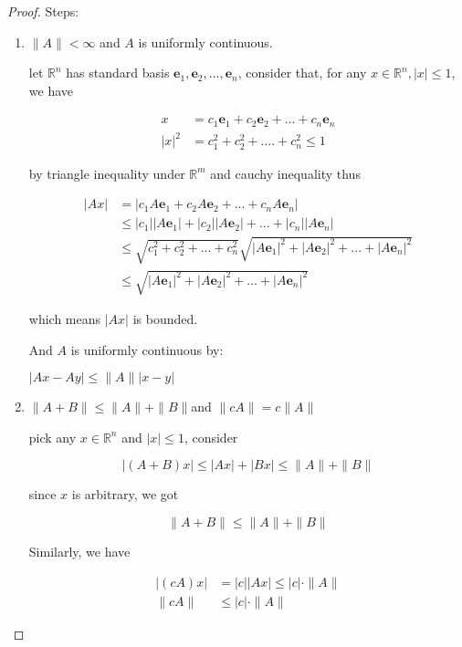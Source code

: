 \begin{proof}
    Steps:

   \begin{enumerate}
    \item $\| A\| < \infty$ and $A$ is uniformly continuous.

    let $\mathbb{R}^n$ has standard basis $\mathbf{e}_1,\mathbf{e}_2,...,\mathbf{e}_n$, consider that,
    for any $x \in \mathbb{R}^n, |x| \le 1$, we have

    \begin{align*}
        x &= c_1\mathbf{e}_1 + c_2\mathbf{e}_2 + ... + c_n\mathbf{e}_n \\
        |x|^2 &= c_1^2 + c_2^2 + .... + c_n^2 \le 1
    \end{align*}

    by triangle inequality under $\mathbb{R}^m$ and cauchy inequality thus

    \begin{align*}
        | Ax| &= \left| c_1 A\mathbf{e}_1 + c_2 A\mathbf{e}_2 + ... + c_n A\mathbf{e}_n\right| \\
        & \le |c_1| \left|  A\mathbf{e}_1 \right| + |c_2| \left|  A\mathbf{e}_2 \right| + ... + |c_n| \left|  A\mathbf{e}_n \right| \\
        & \le \sqrt{c_1^2 + c_2^2 + ... + c_n^2} \sqrt{|A\mathbf{e}_1|^2 + |A\mathbf{e}_2|^2 + ... + |A\mathbf{e}_n|^2} \\
        & \le \sqrt{|A\mathbf{e}_1|^2 + |A\mathbf{e}_2|^2 + ... + |A\mathbf{e}_n|^2}
    \end{align*}

    which means $|Ax| $ is bounded.

    And $A$ is uniformly continuous by:

    $\left| Ax - Ay \right| \le \| A \| \left| x -y \right|$

    \item $\| A + B\| \le \| A \| + \| B \|$and $\| c A\| = c \| A \|$

    pick any $x \in \mathbb{R}^n$ and $|x| \le 1$, consider

    \[
        \left| (A+B) x\right| \le |Ax| + |Bx| \le  \| A \| + \| B \|
    \]

    since $x$ is arbitrary, we got


    \[
        \| A+B\| \le  \| A \| + \| B \|
    \]

    Similarly, we have

    \begin{align*}
        \left| (cA) x \right| & = |c| \left| A x \right| \le |c| \cdot \| A \| \\
        \| cA \|&  \le |c| \cdot \| A \|
    \end{align*}


\end{enumerate}
\end{proof}
